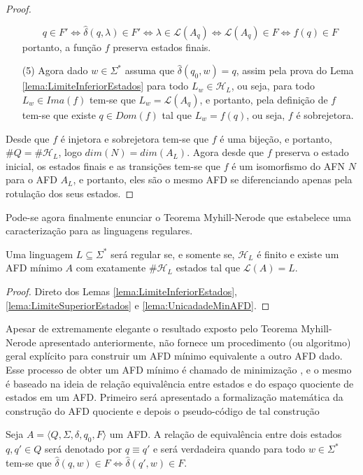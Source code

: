 \begin{proof}
\begin{itemize}
		$$q \in F' \Longleftrightarrow \widehat{\delta}(q, \lambda) \in F' \Longleftrightarrow  \lambda \in \mathcal{L}(A_q) \Longleftrightarrow \mathcal{L}(A_q) \in F \Longleftrightarrow f(q) \in F$$
		portanto, a função $f$ preserva estados finais.
		\item[(5)] Agora dado $w \in \Sigma^*$ assuma que $\widehat{\delta}(q_0, w) = q$, assim pela prova do Lema \ref{lema:LimiteInferiorEstados} para todo $L_w \in \mathcal{H}_L$, ou seja, para todo $L_w \in Ima(f)$ tem-se que $L_w = \mathcal{L}(A_q)$, e portanto, pela definição de $f$ tem-se que existe $q \in D	om(f)$ tal que $L_w = f(q)$, ou seja, $f$ é sobrejetora.
	\end{itemize}
	Desde que $f$ é injetora e sobrejetora tem-se que $f$ é uma bijeção, e portanto, $\#Q = \#\mathcal{H}_L$, logo $dim(N) = dim(A_L)$. Agora desde que $f$ preserva o estado inicial, os estados finais e as transições tem-se que $f$ é um isomorfismo do AFN $N$ para o AFD $A_L$, e portanto, eles são o mesmo AFD se diferenciando apenas pela rotulação dos seus estados. 
\end{proof}

Pode-se agora finalmente enunciar o Teorema Myhill-Nerode que estabelece uma caracterização para as linguagens regulares.

\begin{theorem}\label{teo:Myhill-Nerode}
	Uma linguagem $L \subseteq \Sigma^*$ será regular se, e somente se, $\mathcal{H}_L$ é finito e existe um AFD mínimo $A$ com exatamente $\# \mathcal{H}_L$ estados tal que $\mathcal{L}(A) = L$.
\end{theorem}

\begin{proof}
	Direto dos Lemas \ref{lema:LimiteInferiorEstados}, \ref{lema:LimiteSuperiorEstados} e \ref{lema:UnicadadeMinAFD}.
\end{proof}

Apesar de extremamente elegante o resultado exposto pelo Teorema Myhill-Nerode apresentado anteriormente, não fornece um procedimento (ou algoritmo) geral explícito para construir um AFD mínimo equivalente a outro AFD dado. Esse processo de obter um AFD mínimo é chamado de minimização \cite{benjaLivro2010}, e o mesmo é baseado na ideia de relação equivalência entre estados e do espaço quociente de estados em um AFD. Primeiro será apresentado a formalização matemática da construção do AFD quociente e depois o pseudo-código de tal construção

\begin{definition}\label{def:EquivalenciaEstados}
	Seja $A = \langle Q, \Sigma, \delta, q_0, F\rangle$ um AFD. A relação de equivalência entre dois estados $q, q' \in Q$ será denotado por $q \equiv q'$ e será verdadeira quando para todo $w \in \Sigma^*$ tem-se que $\widehat{\delta}(q, w) \in F \Longleftrightarrow \widehat{\delta}(q', w) \in F$.
\end{definition} 

